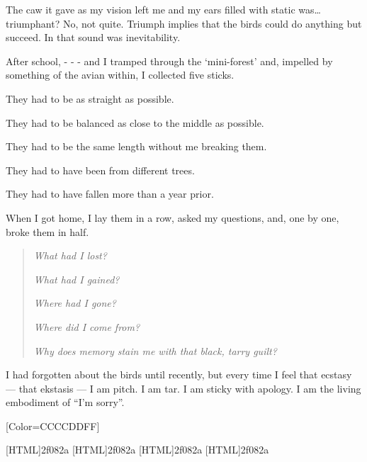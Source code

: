 \begin{paracol}{2}
\begin{leftcolumn}
The caw it gave as my vision left me and my ears filled with static was\ldots{}triumphant? No, not quite. Triumph implies that the birds could do anything but succeed. In that sound was inevitability.

After school, - - - and I tramped through the `mini-forest' and, impelled by something of the avian within, I collected five sticks.

They had to be as straight as possible.

They had to be balanced as close to the middle as possible.

They had to be the same length without me breaking them.

They had to have been from different trees.

They had to have fallen more than a year prior.

When I got home, I lay them in a row, asked my questions, and, one by one, broke them in half.

\begin{quotation}
\emph{What had I lost?}

\emph{What had I gained?}

\emph{Where had I gone?}

\emph{Where did I come from?}

\emph{Why does memory stain me with that black, tarry guilt?}
\end{quotation}

I had forgotten about the birds until recently, but every time I feel that ecstasy --- that ekstasis --- I am pitch. I am tar. I am sticky with apology. I am the living embodiment of ``I'm sorry''.
\newpage
\end{leftcolumn}
\end{paracol}
\resetbackgroundcolor


\renewfontfamily{}[Color=CCCCDDFF]

[HTML]{2f082a}
[HTML]{2f082a}
[HTML]{2f082a}
[HTML]{2f082a}


